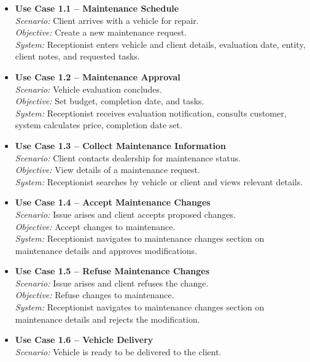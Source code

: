 \begin{itemize}
    \item \textbf{Use Case 1.1 – Maintenance Schedule}\\
    \textit{Scenario:} Client arrives with a vehicle for repair.\\
    \textit{Objective:} Create a new maintenance request.\\
    \textit{System:} Receptionist enters vehicle and client details, evaluation date, entity, client notes, and requested tasks.
    \item \textbf{Use Case 1.2 – Maintenance Approval}\\
    \textit{Scenario:} Vehicle evaluation concludes.\\
    \textit{Objective:} Set budget, completion date, and tasks.\\
    \textit{System:} Receptionist receives evaluation notification, consults customer, system calculates price, completion date set.
    \item \textbf{Use Case 1.3 – Collect Maintenance Information}\\
    \textit{Scenario:} Client contacts dealership for maintenance status.\\
    \textit{Objective:} View details of a maintenance request.\\
    \textit{System:} Receptionist searches by vehicle or client and views relevant details.
    \item \textbf{Use Case 1.4 – Accept Maintenance Changes}\\
    \textit{Scenario:} Issue arises and client accepts proposed changes.\\
    \textit{Objective:} Accept changes to maintenance.\\
    \textit{System:} Receptionist navigates to maintenance changes section on maintenance details and approves modifications.
    \item \textbf{Use Case 1.5 – Refuse Maintenance Changes}\\
    \textit{Scenario:} Issue arises and client refuses the change.\\
    \textit{Objective:} Refuse changes to maintenance.\\
    \textit{System:} Receptionist navigates to maintenance changes section on maintenance details and rejects the modification.
    \item \textbf{Use Case 1.6 – Vehicle Delivery}\\
    \textit{Scenario:} Vehicle is ready to be delivered to the client.\\

\end{itemize}
